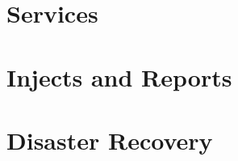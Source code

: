 \documentclass[letterpaper, 10pt]{report}
\begin{document}


\chapter{Services}










\chapter{Injects and Reports}

\chapter{Disaster Recovery}






\printindex


\end{document}
